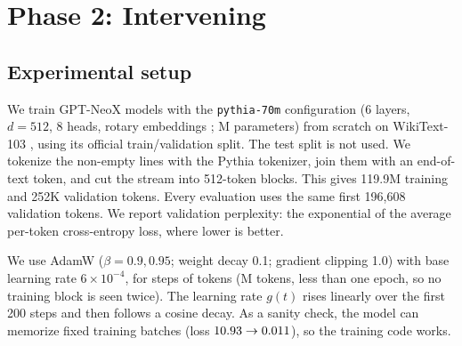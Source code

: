 \documentclass[11pt]{article}
\newcommand{\tf}{t_{50}}
\begin{document}
\section{Phase 2: Intervening}



\subsection{Experimental setup}

We train GPT-NeoX models with the \texttt{pythia-70m} configuration (6 layers,
$d = 512$, 8 heads, rotary embeddings \citep{su2024roformer}; \PhaseTwoParams{}M
parameters) from scratch on WikiText-103 \citep{merity2017pointer}, using its
official train/validation split. The test split is not used. We tokenize the
non-empty lines with the Pythia tokenizer, join them with an end-of-text token,
and cut the stream into 512-token blocks. This gives 119.9M training and 252K
validation tokens. Every evaluation uses the same first 196,608 validation
tokens. We report validation perplexity: the exponential of the average
per-token cross-entropy loss, where lower is better.

We use AdamW \citep{loshchilov2019adamw} ($\beta = 0.9, 0.95$; weight decay
0.1; gradient clipping 1.0) with base learning rate $6\times10^{-4}$, for
\PhaseTwoSteps{} steps of \PhaseTwoTokensPerStep{} tokens (\PhaseTwoTokens{}M
tokens, less than one epoch, so no training block is seen twice). The learning
rate $g(t)$ rises linearly over the first 200 steps and then follows a cosine
decay. As a sanity check, the model can memorize \OverfitBatches{} fixed
training batches (loss $10.93 \rightarrow 0.011$), so the
training code works.
\end{document}
